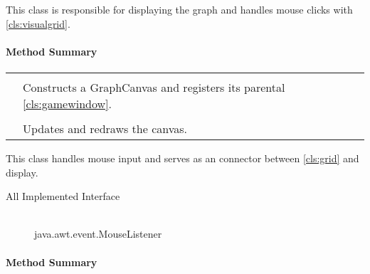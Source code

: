 
This class is responsible for displaying the graph and handles mouse clicks with \ref{cls:visualgrid}. \\ 
\centerdash

\paragraph*{Method Summary}
\paragraph*{}
\begin{longtable}{Lp{10cm}}
	\startmethodtable
	 \\
	& Constructs a GraphCanvas and registers its parental \ref{cls:gamewindow}. \\
	 \\
	& Updates and redraws the canvas. \\ \hline
\end{longtable}


This class handles mouse input and serves as an connector between \ref{cls:grid} and display. \\ 
\begin{description}
	\item[All Implemented Interface] \hfill \\
	java.awt.event.MouseListener
\end{description}
\centerdash

\paragraph*{Method Summary}
